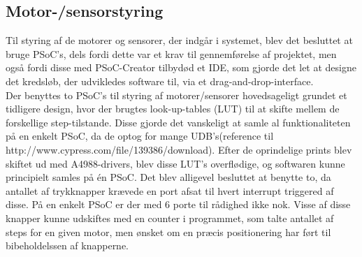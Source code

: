 \subsection{Motor-/sensorstyring}
Til styring af de motorer og sensorer, der indgår i systemet, blev det besluttet at bruge PSoC's, dels fordi dette var et krav til gennemførelse af projektet, men også fordi disse med PSoC-Creator tilbydød et IDE, som gjorde det let at designe det kredsløb, der udvikledes software til, via et drag-and-drop-interface. \\

Der benyttes to PSoC's til styring af motorer/sensorer hovedsageligt grundet et tidligere design, hvor der brugtes look-up-tables (LUT) til at skifte mellem de forskellige step-tilstande. Disse gjorde det vanskeligt at samle al funktionaliteten på en enkelt PSoC, da de optog for mange UDB's(reference til http://www.cypress.com/file/139386/download). Efter de oprindelige prints blev skiftet ud med A4988-drivers, blev disse LUT's overflødige, og softwaren kunne principielt samles på én PSoC. Det blev alligevel besluttet at benytte to, da antallet af trykknapper krævede en port afsat til hvert interrupt triggered af disse. På en enkelt PSoC er der med 6 porte til rådighed ikke nok. Visse af disse knapper kunne udskiftes med en counter i programmet, som talte antallet af steps for en given motor, men ønsket om en præcis positionering har ført til bibeholdelssen af knapperne.